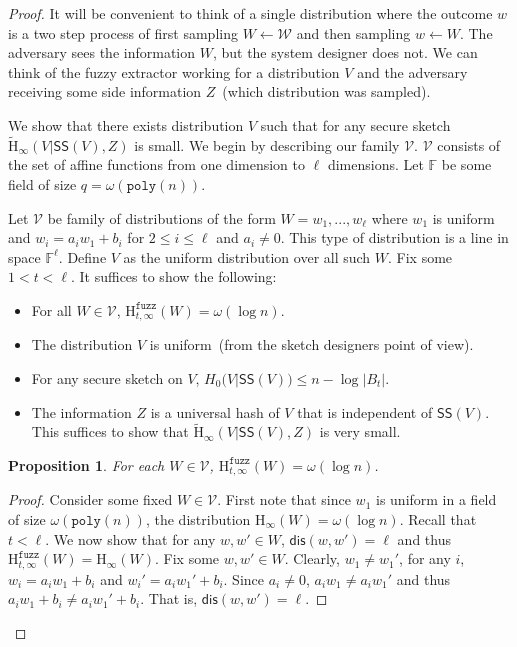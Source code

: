 \documentclass[11pt]{article}
\newcommand{\class}[1]{{\ensuremath{\mathsf{#1}}}}
\newcommand{\sketch}{\ensuremath{\class{SS}}\xspace}
\newcommand{\dis}{\ensuremath{\mathsf{dis}}}
\newcommand{\poly}{\ensuremath{\mathtt{poly}}\xspace}
\newcommand{\Hoo}{\mathrm{H}_\infty}
\newcommand{\Hav}{\tilde{\mathrm{H}}_\infty}
\newcommand{\Hfuzz}{\mathrm{H}^{\mathtt{fuzz}}_{t,\infty}}
\newtheorem{proposition}[theorem]{Proposition}
\begin{document}
\begin{proof}
It will be convenient to think of a single distribution where the outcome $w$ is a two step process of first sampling $W\leftarrow \mathcal{W}$ and then sampling $w\leftarrow W$.  The adversary sees the information $W$, but the system designer does not.  We can think of the fuzzy extractor working for a distribution $V$ and the adversary receiving some side information $Z$~(which distribution was sampled).  

We show that there exists distribution $V$ such that for any secure sketch $\Hav(V | \sketch(V), Z)$ is small.  We begin by describing our family $\mathcal{V}$.  $\mathcal{V}$ consists of the set of affine functions from one dimension to $\ell$ dimensions.  %
Let $\mathbb{F}$ be some field of size $q =\omega(\poly(n))$.  

Let $\mathcal{V}$ be family of distributions of the form $W = w_1,..., w_\ell$ where $w_1$ is uniform and $w_i = a_i w_1 + b_i$ for $2\le i \le \ell$ and $a_i\neq 0$.  This type of distribution is a line in space $\mathbb{F}^\ell$.  Define $V$ as the uniform distribution over all such $W$.  Fix some $1< t < \ell$.
It suffices to show the following:

\begin{itemize}
\item For all $W\in \mathcal{V}$, $\Hfuzz(W) = \omega (\log n)$.
\item The distribution $V$ is uniform~(from the sketch designers point of view).
\item For any secure sketch on $V$, $H_0(V | \sketch(V)) \le n -\log |B_t|$.
\item The information $Z$ is a universal hash of $V$ that is independent of $\sketch(V)$. This suffices to show that $\Hav(V| \sketch(V), Z)$ is very small.
\end{itemize}
\begin{proposition} For each $W\in\mathcal{V}$, $\Hfuzz(W) = \omega(\log n)$.
\end{proposition}
\begin{proof}
Consider some fixed $W\in\mathcal{V}$.  First note that since $w_1$ is uniform in a field of size $\omega(\poly(n))$, the distribution $\Hoo(W) =\omega(\log n)$.  Recall that $t< \ell$.  We now show that for any $w, w'\in W$, $\dis(w, w') = \ell$ and thus $\Hfuzz(W) = \Hoo(W)$.  Fix some $w, w'\in W$.  Clearly, $w_1 \neq w_1'$, for any $i$, $w_i = a_i w_1 + b_i$ and $w_i' = a_i w_1' + b_i$.  Since $a_i\neq 0$, $a_iw_1 \neq a_iw_1'$ and thus $a_iw_1+b_i \neq a_iw_1'+b_i$.  That is, $\dis (w, w')  =\ell$.
\end{proof}


\end{proof}
\end{document}
